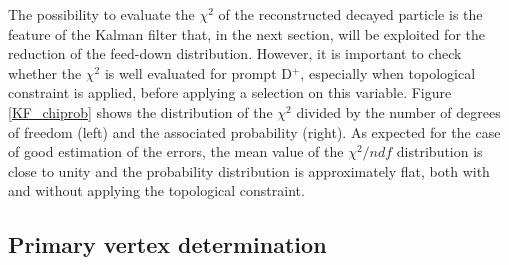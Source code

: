 \documentclass[b5paper,10pt,twoside,oldstyle,classica]{toptesi}
\begin{document}
The possibility to evaluate the $\chi^2$ of the reconstructed decayed particle is the feature of the Kalman filter that, in the next section, will be exploited for the reduction of the feed-down distribution. However, it is important to check whether the $\chi^2$ is well evaluated for prompt D$^+$, especially when topological constraint is applied, before applying a selection on this variable. Figure \ref{KF_chiprob} shows the distribution of the $\chi^2$ divided by the number of degrees of freedom (left) and the associated probability (right). As expected for the case of good estimation of the errors, the mean value of the $\chi^2/ndf$ distribution is close to unity and the probability distribution is approximately flat, both with and without applying the topological constraint.    
\subsection{Primary vertex determination}
\end{document}
